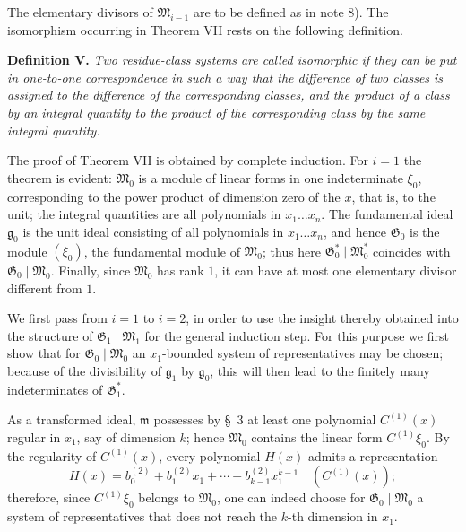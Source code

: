\documentclass[11pt]{article}
\providecommand{\Gmod}{\mathfrak G}
\providecommand{\Mmod}{\mathfrak M}
\providecommand{\mideal}{\mathfrak m}
\providecommand{\gideal}{\mathfrak g}
\begin{document}
The elementary divisors of $\Mmod_{i-1}$ are to be defined as in note 8). The isomorphism occurring in Theorem VII rests on the following definition.

\medskip
\noindent\textbf{Definition V.} \emph{Two residue-class systems are called isomorphic if they can be put in one-to-one correspondence in such a way that the difference of two classes is assigned to the difference of the corresponding classes, and the product of a class by an integral quantity to the product of the corresponding class by the same integral quantity.}

The proof of Theorem VII is obtained by complete induction. For $i=1$ the theorem is evident: $\Mmod_0$ is a module of linear forms in one indeterminate $\xi_0$, corresponding to the power product of dimension zero of the $x$, that is, to the unit; the integral quantities are all polynomials in $x_1\ldots x_n$. The fundamental ideal $\gideal_0$ is the unit ideal consisting of all polynomials in $x_1\ldots x_n$, and hence $\Gmod_0$ is the module $(\xi_0)$, the fundamental module of $\Mmod_0$; thus here $\Gmod^*_0\mid\Mmod^*_0$ coincides with $\Gmod_0\mid\Mmod_0$. Finally, since $\Mmod_0$ has rank $1$, it can have at most one elementary divisor different from $1$.

We first pass from $i=1$ to $i=2$, in order to use the insight thereby obtained into the structure of $\Gmod_1\mid\Mmod_1$ for the general induction step. For this purpose we first show that for $\Gmod_0\mid\Mmod_0$ an $x_1$-bounded system of representatives may be chosen; because of the divisibility of $\gideal_1$ by $\gideal_0$, this will then lead to the finitely many indeterminates of $\Gmod^*_1$.

As a transformed ideal, $\mideal$ possesses by §~3 at least one polynomial $C^{(1)}(x)$ regular in $x_1$, say of dimension $k$; hence $\Mmod_0$ contains the linear form $C^{(1)}\xi_0$. By the regularity of $C^{(1)}(x)$, every polynomial $H(x)$ admits a representation
\begin{equation}
 H(x)=b^{(2)}_0+b^{(2)}_1x_1+\cdots+b^{(2)}_{k-1}x_1^{k-1}\quad(C^{(1)}(x));
\tag{21}
\end{equation}
therefore, since $C^{(1)}\xi_0$ belongs to $\Mmod_0$, one can indeed choose for $\Gmod_0\mid\Mmod_0$ a system of representatives that does not reach the $k$-th dimension in $x_1$.
\end{document}
